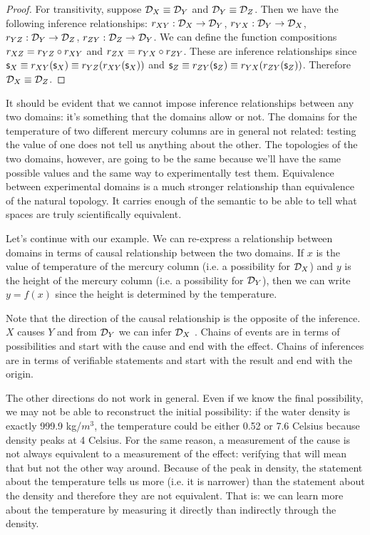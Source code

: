 \documentclass[11pt,letterpaper,fleqn]{memoir} %
\begin{document}
\begin{mathSection}
\begin{proof}
		For transitivity, suppose $\mathcal{D}_X \equiv \mathcal{D}_Y$ and $\mathcal{D}_Y \equiv \mathcal{D}_Z$. Then we have the following inference relationships: $r_{XY} : \mathcal{D}_X \to \mathcal{D}_Y$, $r_{YX} : \mathcal{D}_Y \to \mathcal{D}_X$, $r_{YZ} : \mathcal{D}_Y \to \mathcal{D}_Z$, $r_{ZY} : \mathcal{D}_Z \to \mathcal{D}_Y$. We can define the function compositions $r_{XZ} = r_{YZ} \circ r_{XY}$ and $r_{ZX} = r_{YX} \circ r_{ZY}$. These are inference relationships since $\mathsf{s}_X \equiv r_{XY}(\mathsf{s}_X) \equiv r_{YZ}(r_{XY}(\mathsf{s}_X))$ and $\mathsf{s}_Z \equiv r_{ZY}(\mathsf{s}_Z) \equiv r_{YX}(r_{ZY}(\mathsf{s}_Z))$. Therefore $\mathcal{D}_X \equiv \mathcal{D}_Z$.
	\end{proof}
\end{mathSection}


It should be evident that we cannot impose inference relationships between any two domains: it's something that the domains allow or not. The domains for the temperature of two different mercury columns are in general not related: testing the value of one does not tell us anything about the other. The topologies of the two domains, however, are going to be the same because we'll have the same possible values and the same way to experimentally test them. Equivalence between experimental domains is a much stronger relationship than equivalence of the natural topology. It carries enough of the semantic to be able to tell what spaces are truly scientifically equivalent.

Let's continue with our example. We can re-express a relationship between domains in terms of causal relationship between the two domains. If $x$ is the value of temperature of the mercury column (i.e. a possibility for $\mathcal{D}_X$) and $y$ is the height of the mercury column (i.e. a possibility for $\mathcal{D}_Y$), then we can write $y=f(x)$ since the height is determined by the temperature.

Note that the direction of the causal relationship is the opposite of the inference. $X$ causes $Y$ and from $\mathcal{D}_Y$ we can infer $\mathcal{D}_X$ . Chains of events are in terms of possibilities and start with the cause and end with the effect. Chains of inferences are in terms of verifiable statements and start with the result and end with the origin.

The other directions do not work in general. Even if we know the final possibility, we may not be able to reconstruct the initial possibility: if the water density is exactly 999.9 kg/$m^3$, the temperature could be either 0.52 or 7.6 Celsius because density peaks at 4 Celsius. For the same reason, a measurement of the cause is not always equivalent to a measurement of the effect: verifying that  will mean that  but not the other way around. Because of the peak in density, the statement about the temperature tells us more (i.e. it is narrower) than the statement about the density and therefore they are not equivalent. That is: we can learn more about the temperature by measuring it directly than indirectly through the density.
\end{document}
